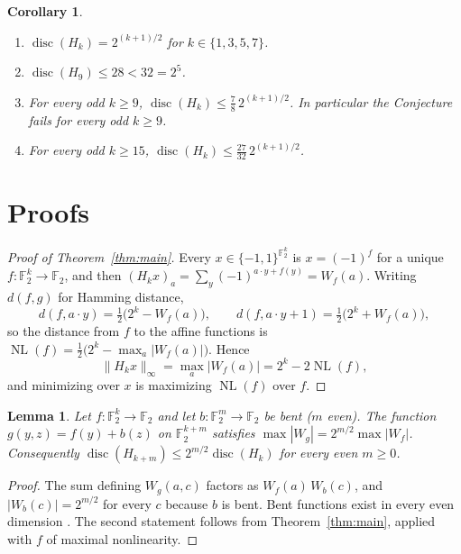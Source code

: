 \documentclass[11pt]{amsart}
\newtheorem{corollary}[theorem]{Corollary}
\newtheorem{lemma}[theorem]{Lemma}
\theoremstyle{remark}
\newcommand{\F}{\mathbb{F}_2}
\newcommand{\disc}{\operatorname{disc}}
\newcommand{\NL}{\operatorname{NL}}
\begin{document}
\begin{corollary}\label{cor}
\begin{enumerate}
\item $\disc(H_k)=2^{(k+1)/2}$ for $k\in\{1,3,5,7\}$.
\item $\disc(H_9)\le 28<32=2^{5}$.
\item For every odd $k\ge9$, $\disc(H_k)\le \tfrac78\,2^{(k+1)/2}$. In particular the
Conjecture fails for every odd $k\ge 9$.
\item For every odd $k\ge15$, $\disc(H_k)\le \tfrac{27}{32}\,2^{(k+1)/2}$.
\end{enumerate}
\end{corollary}

\section{Proofs}

\begin{proof}[Proof of Theorem~\ref{thm:main}]
Every $x\in\{-1,1\}^{\F^k}$ is $x=(-1)^f$ for a unique $f\colon\F^k\to\F$, and then
$(H_kx)_a=\sum_y(-1)^{a\cdot y+f(y)}=W_f(a)$. Writing $d(f,g)$ for Hamming
distance,
\[
d(f,a\cdot y)=\tfrac12\bigl(2^k-W_f(a)\bigr),\qquad
d(f,a\cdot y+1)=\tfrac12\bigl(2^k+W_f(a)\bigr),
\]
so the distance from $f$ to the affine functions is
$\NL(f)=\tfrac12\bigl(2^k-\max_a|W_f(a)|\bigr)$. Hence
\[
\|H_kx\|_\infty=\max_a|W_f(a)|=2^k-2\NL(f),
\]
and minimizing over $x$ is maximizing $\NL(f)$ over $f$.
\end{proof}

\begin{lemma}\label{lem:sum}
Let $f\colon\F^k\to\F$ and let $b\colon\F^m\to\F$ be bent ($m$ even). The function
$g(y,z)=f(y)+b(z)$ on $\F^{k+m}$ satisfies $\max|W_g|=2^{m/2}\max|W_f|$.
Consequently $\disc(H_{k+m})\le 2^{m/2}\disc(H_k)$ for every even $m\ge0$.
\end{lemma}

\begin{proof}
The sum defining $W_g(a,c)$ factors as $W_f(a)\,W_b(c)$, and $|W_b(c)|=2^{m/2}$
for every $c$ because $b$ is bent. Bent functions exist in every even
dimension \cite{Rothaus}. The second statement follows from
Theorem~\ref{thm:main}, applied with $f$ of maximal nonlinearity.
\end{proof}
\end{document}
